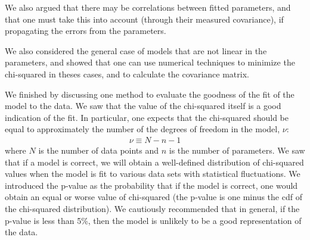 We also argued that there may be correlations between fitted parameters, and that one must take this into account (through their measured covariance), if propagating the errors from the parameters.

We also considered the general case of models that are not linear in the parameters, and showed that one can use numerical techniques to minimize the chi-squared in theses cases, and to calculate the covariance matrix.

We finished by discussing one method to evaluate the goodness of the fit of the model to the data. We saw that the value of the chi-squared itself is a good indication of the fit. In particular, one expects that the chi-squared should be equal to approximately the number of the degrees of freedom in the model, $\nu$:
\begin{align}
\nu\equiv N-n-1
\end{align}
where $N$ is the number of data points and $n$ is the number of parameters. We saw that if a model is correct, we will obtain a well-defined distribution of chi-squared values when the model is fit to various data sets with statistical fluctuations. We introduced the p-value as the probability that if the model is correct, one would obtain an equal or worse value of chi-squared (the p-value is one minus the cdf of the chi-squared distribution). We cautiously recommended that in general, if the p-value is less than 5\%, then the model is unlikely to be a good representation of the data.
